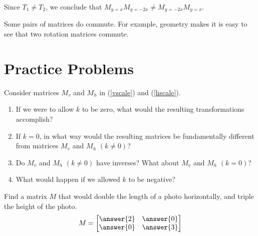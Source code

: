 \documentclass{ximera}
\begin{document}
\begin{example}
\begin{center}
\end{center}

Since $T_1\neq T_2$, we conclude that $M_{y=x}M_{y=-2x}\neq M_{y=-2x}M_{y=x}$.

\end{example}

\begin{example}\label{ex:rotationscommute}
Some pairs of matrices do commute.  For example, geometry makes it is easy to see that two rotation matrices commute.
\end{example}

\section*{Practice Problems}
\begin{problem}\label{prob:k0}
Consider matrices $M_v$ and $M_h$ in (\ref{vscale}) and (\ref{hscale}).  
\begin{enumerate}
\item
If we were to allow $k$ to be zero, what would the resulting transformations accomplish?  
\item If $k=0$, in what way would the resulting matrices be fundamentally different from matrices $M_v$ and $M_h$ $(k\neq 0)$?  
\item Do $M_v$ and $M_h$ $(k\neq 0)$ have inverses?  What about $M_v$ and $M_h$ $(k= 0)$?  
\item What would happen if we allowed $k$ to be negative?
\end{enumerate}
\end{problem}

\begin{problem}\label{prob:matrixlintrans} Find a matrix $M$ that would double the length of a photo horizontally, and triple the height of the photo.
$$M=\begin{bmatrix}\answer{2} & \answer{0}\\\answer{0} & \answer{3}\end{bmatrix}$$
\end{problem}
\end{document}

